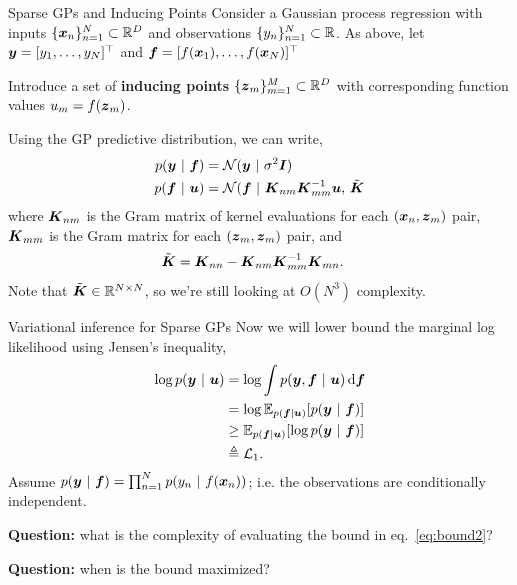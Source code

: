 \documentclass[aspectratio=169]{beamer}
\begin{document}
\begin{frame}{Sparse GPs and Inducing Points}
    Consider a Gaussian process regression with inputs $\{\boldsymbol{x}_n\}_{n=1}^N \subset \mathbb{R}^D$ and observations $\{y_n\}_{n=1}^N \subset \mathbb{R}$. As above, let $\boldsymbol{y} = [y_1, \ldots, y_N]^\top$ and $\boldsymbol{f} = [f(\boldsymbol{x}_1), \ldots, f(\boldsymbol{x}_N)]^\top$
    
    Introduce a set of \textbf{inducing points} $\{\boldsymbol{z}_m\}_{m=1}^M \subset \mathbb{R}^D$ with corresponding function values $u_m = f(\boldsymbol{z}_m)$.  
    
    Using the GP predictive distribution, we can write,
    \begin{align}
    p(\boldsymbol{y} ~\vert~ \boldsymbol{f}) &= \mathcal{N}(\boldsymbol{y} ~\vert~ \sigma^2 \boldsymbol{I}) \\
    p(\boldsymbol{f} ~\vert~ \boldsymbol{u}) &= \mathcal{N}(\boldsymbol{f} ~\vert~ \boldsymbol{K}_{nm} \boldsymbol{K}_{mm}^{-1} \boldsymbol{u}, \, \tilde{\boldsymbol{K}}
    \end{align}
    where $\boldsymbol{K}_{nm}$ is the Gram matrix of kernel evaluations for each $(\boldsymbol{x}_n, \boldsymbol{z}_m)$ pair, $\boldsymbol{K}_{mm}$ is the Gram matrix for each $(\boldsymbol{z}_m, \boldsymbol{z}_m)$ pair, and
    \begin{align}
        \tilde{\boldsymbol{K}} &= \boldsymbol{K}_{nn} - \boldsymbol{K}_{nm} \boldsymbol{K}_{mm}^{-1} \boldsymbol{K}_{mn}.
    \end{align}
    Note that $\tilde{\boldsymbol{K}} \in \mathbb{R}^{N \times N}$, so we're still looking at $O(N^3)$ complexity.
    
\end{frame}

\begin{frame}{Variational inference for Sparse GPs}
    Now we will lower bound the marginal log likelihood using Jensen's inequality,
    \begin{align}
        \log p(\boldsymbol{y} ~\vert~ \boldsymbol{u}) &= 
        \log \int p(\boldsymbol{y}, \boldsymbol{f} ~\vert~ \boldsymbol{u}) \mathop{}\!\mathrm{d} \boldsymbol{f} \\
        \label{eq:bound1} &= \log \mathbb{E}_{p(\boldsymbol{f} | \boldsymbol{u})}[p(\boldsymbol{y} ~\vert~ \boldsymbol{f})] \\
        \label{eq:bound2} &\geq \mathbb{E}_{p(\boldsymbol{f} | \boldsymbol{u})}[\log p(\boldsymbol{y} ~\vert~ \boldsymbol{f})] \\
        &\triangleq \mathcal{L}_1.
    \end{align}
    Assume $p(\boldsymbol{y} ~\vert~ \boldsymbol{f}) = \prod_{n=1}^N p(y_n ~\vert~ f(\boldsymbol{x}_n))$; i.e. the observations are conditionally independent. 
    
    \textbf{Question: } what is the complexity of evaluating the bound in eq.~\eqref{eq:bound2}?
    
    \textbf{Question: } when is the bound maximized?
    
\end{frame}
\end{document}

